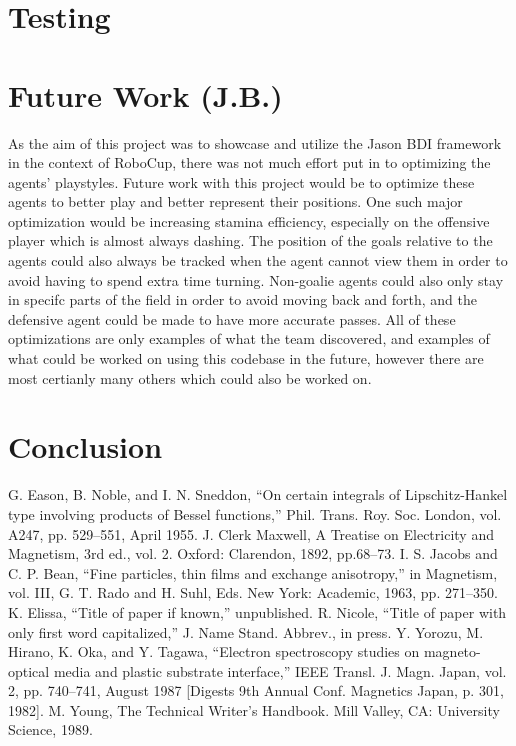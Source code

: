 \documentclass[conference]{IEEEtran}
\begin{document}
\section{Testing}

\section{Future Work (J.B.)}
As the aim of this project was to showcase and utilize the Jason BDI framework in the context of RoboCup, there was not much effort put in to optimizing the agents' playstyles.
Future work with this project would be to optimize these agents to better play and better represent their positions.
One such major optimization would be increasing stamina efficiency, especially on the offensive player which is almost always dashing.
The position of the goals relative to the agents could also always be tracked when the agent cannot view them in order to avoid having to spend extra time turning.
Non-goalie agents could also only stay in specifc parts of the field in order to avoid moving back and forth, and the defensive agent could be made to have more accurate passes.
All of these optimizations are only examples of what the team discovered, and examples of what could be worked on using this codebase in the future, however there are most certianly many others which could also be worked on.

\section{Conclusion}

\begin{thebibliography}{00}
 G. Eason, B. Noble, and I. N. Sneddon, ``On certain integrals of Lipschitz-Hankel type involving products of Bessel functions,'' Phil. Trans. Roy. Soc. London, vol. A247, pp. 529--551, April 1955.
 J. Clerk Maxwell, A Treatise on Electricity and Magnetism, 3rd ed., vol. 2. Oxford: Clarendon, 1892, pp.68--73.
 I. S. Jacobs and C. P. Bean, ``Fine particles, thin films and exchange anisotropy,'' in Magnetism, vol. III, G. T. Rado and H. Suhl, Eds. New York: Academic, 1963, pp. 271--350.
 K. Elissa, ``Title of paper if known,'' unpublished.
 R. Nicole, ``Title of paper with only first word capitalized,'' J. Name Stand. Abbrev., in press.
 Y. Yorozu, M. Hirano, K. Oka, and Y. Tagawa, ``Electron spectroscopy studies on magneto-optical media and plastic substrate interface,'' IEEE Transl. J. Magn. Japan, vol. 2, pp. 740--741, August 1987 [Digests 9th Annual Conf. Magnetics Japan, p. 301, 1982].
 M. Young, The Technical Writer's Handbook. Mill Valley, CA: University Science, 1989.
\end{thebibliography}
\end{document}
